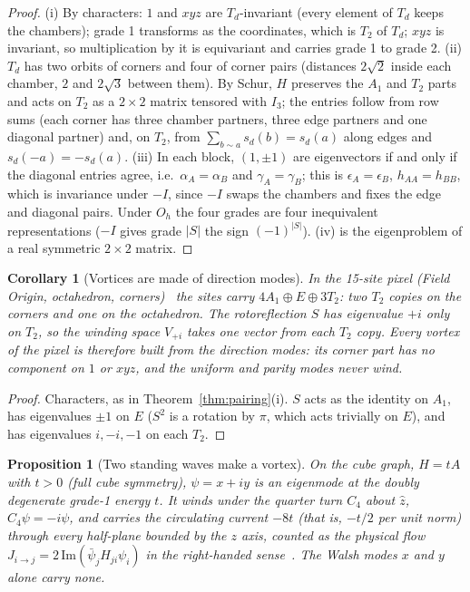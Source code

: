 \documentclass[twocolumn]{iopjournal}
\newtheorem{proposition}{Proposition}
\newtheorem{corollary}{Corollary}
\theoremstyle{definition}
\theoremstyle{remark}
\begin{document}
\begin{proof}
(i) By characters: $1$ and $xyz$ are $T_d$-invariant (every element of
$T_d$ keeps the chambers); grade 1 transforms as the coordinates, which is
$T_2$ of $T_d$; $xyz$ is invariant, so multiplication by it is
equivariant and carries grade 1 to grade 2. (ii) $T_d$ has two orbits of
corners and four of corner pairs (distances $2\sqrt2$ inside each
chamber, $2$ and $2\sqrt3$ between them). By Schur, $H$ preserves the
$A_1$ and $T_2$ parts and acts on $T_2$ as a $2\times2$ matrix tensored
with $I_3$; the entries follow from row sums (each corner has three
chamber partners, three edge partners and one diagonal partner) and, on
$T_2$, from $\sum_{b \sim a} s_d(b) = s_d(a)$ along edges and $s_d(-a) =
-s_d(a)$. (iii) In each block, $(1, \pm1)$ are eigenvectors if and only
if the diagonal entries agree, i.e.\ $\alpha_A = \alpha_B$ and $\gamma_A =
\gamma_B$; this is $\epsilon_A = \epsilon_B$, $h_{AA} = h_{BB}$, which is
invariance under $-I$, since $-I$ swaps the chambers and fixes the
edge and diagonal pairs. Under $O_h$ the four grades are four
inequivalent representations ($-I$ gives grade $\lvert S\rvert$ the sign
$(-1)^{\lvert S\rvert}$). (iv) is the eigenproblem of a real symmetric
$2\times2$ matrix.
\end{proof}

\begin{corollary}[Vortices are made of direction modes]
In the 15-site pixel (Field Origin, octahedron, corners)~\cite{NelsonVortex}
the sites carry $4A_1 \oplus E \oplus 3T_2$: two $T_2$ copies on the
corners and one on the octahedron. The rotoreflection $S$ has eigenvalue
$+i$ only on $T_2$, so the winding space $V_{+i}$ takes one vector from
each $T_2$ copy. Every vortex of the pixel is therefore built from the
direction modes: its corner part has no component on $1$ or $xyz$, and
the uniform and parity modes never wind.
\end{corollary}

\begin{proof}
Characters, as in Theorem~\ref{thm:pairing}(i). $S$ acts as the identity
on $A_1$, has eigenvalues $\pm1$ on $E$ ($S^2$ is a rotation by $\pi$,
which acts trivially on $E$), and has eigenvalues $i, -i, -1$ on each
$T_2$.
\end{proof}

\begin{proposition}[Two standing waves make a vortex]
\label{prop:cube}
On the cube graph, $H = tA$ with $t > 0$ (full cube symmetry), $\psi = x +
iy$ is an eigenmode at the doubly degenerate grade-1 energy $t$. It winds
under the quarter turn $C_4$ about $\hat z$, $C_4\psi = -i\psi$, and
carries the circulating current $-8t$ (that is, $-t/2$ per unit norm)
through every half-plane bounded by the $z$ axis, counted as the physical
flow $J_{i\to j} = 2\,\mathrm{Im}(\bar\psi_jH_{ji}\psi_i)$ in the
right-handed sense~\cite{NelsonVortex}. The Walsh modes $x$ and $y$
alone carry none.
\end{proposition}
\end{document}

